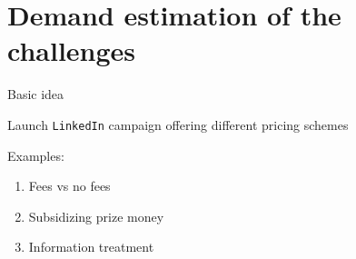 \section{Demand estimation of the
challenges}\label{demand-estimation-of-the-challenges}

\begin{frame}[fragile]{Basic idea}

Launch \texttt{LinkedIn} campaign offering different pricing schemes

Examples:

\begin{enumerate}
\def\labelenumi{\arabic{enumi}.}
\tightlist
\item
  Fees vs no fees
\item
  Subsidizing prize money
\item
  Information treatment
\end{enumerate}

\end{frame}
